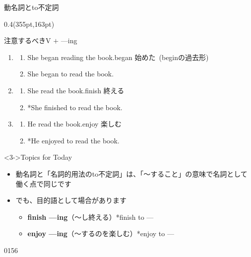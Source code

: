 \documentclass[aspectratio=169,xcolor={dvipsnames,table}]{beamer}
\begin{document}
\begin{frame}[plain,t]{動名詞とto不定詞}
\begin{textblock*}{0.4\linewidth}(355pt,163pt)
\end{textblock*}


\end{frame}
\begin{frame}[plain]{注意するべきV $+$ ---ing}

 \begin{enumerate}
  \item \begin{enumerate}
	 \item<1-> She began reading the book.\hfill{\scriptsize began  始めた\,\,\,(beginの過去形)}
	 \item<2-> She began to read the book.
	\end{enumerate}
  \item \begin{enumerate}
	 \item<4-> She  read the book.\hfill{\scriptsize finish  終える}
	 \item<5-> *She finished to read the book.
	\end{enumerate}
  \item \begin{enumerate}
	 \item<7-> He  read the book.\hfill{\scriptsize enjoy  楽しむ}
	 \item<8-> *He enjoyed to read the book.
	\end{enumerate}
 \end{enumerate}
%
\begin{block}<3->{Topics for Today}
\begin{itemize}[square]\small
 \item<3->  動名詞と「名詞的用法のto不定詞」は、「〜すること」の意味で名詞として働く点で同じです
 \item<6-> でも、目的語として場合があります \dbend
       \begin{itemize}[circle]\small
	\item<6-> \textbf{finish ---ing}（〜し終える）\hfill{}*finish to ---
	\item<9-> \textbf{enjoy ---ing}（〜するのを楽しむ）\hfill{}*enjoy to ---
       \end{itemize}
 \end{itemize}
     \end{block}

\vspace{-10pt}
\hfill{\tiny 0156}\,{\scriptsize {}}
\end{frame}
\end{document}
